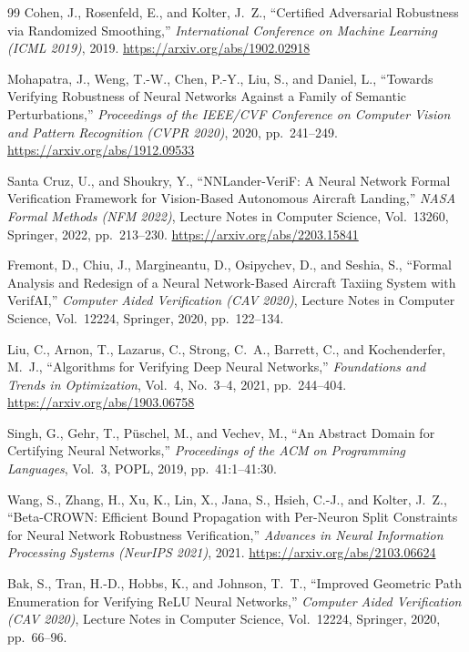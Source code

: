 \documentclass[twocolumn,smallextended,runningheads]{svjour3}
\begin{document}
\begin{thebibliography}{99}
Cohen, J., Rosenfeld, E., and Kolter, J.~Z., ``Certified Adversarial Robustness via Randomized Smoothing,'' \emph{International Conference on Machine Learning (ICML 2019)}, 2019. \url{https://arxiv.org/abs/1902.02918}

Mohapatra, J., Weng, T.-W., Chen, P.-Y., Liu, S., and Daniel, L., ``Towards Verifying Robustness of Neural Networks Against a Family of Semantic Perturbations,'' \emph{Proceedings of the IEEE/CVF Conference on Computer Vision and Pattern Recognition (CVPR 2020)}, 2020, pp.~241--249. \url{https://arxiv.org/abs/1912.09533}

Santa Cruz, U., and Shoukry, Y., ``NNLander-VeriF: A Neural Network Formal Verification Framework for Vision-Based Autonomous Aircraft Landing,'' \emph{NASA Formal Methods (NFM 2022)}, Lecture Notes in Computer Science, Vol.~13260, Springer, 2022, pp.~213--230. \url{https://arxiv.org/abs/2203.15841}

Fremont, D., Chiu, J., Margineantu, D., Osipychev, D., and Seshia, S., ``Formal Analysis and Redesign of a Neural Network-Based Aircraft Taxiing System with VerifAI,'' \emph{Computer Aided Verification (CAV 2020)}, Lecture Notes in Computer Science, Vol.~12224, Springer, 2020, pp.~122--134.

Liu, C., Arnon, T., Lazarus, C., Strong, C.~A., Barrett, C., and Kochenderfer, M.~J., ``Algorithms for Verifying Deep Neural Networks,'' \emph{Foundations and Trends in Optimization}, Vol.~4, No.~3--4, 2021, pp.~244--404. \url{https://arxiv.org/abs/1903.06758}

Singh, G., Gehr, T., P\"{u}schel, M., and Vechev, M., ``An Abstract Domain for Certifying Neural Networks,'' \emph{Proceedings of the ACM on Programming Languages}, Vol.~3, POPL, 2019, pp.~41:1--41:30.

Wang, S., Zhang, H., Xu, K., Lin, X., Jana, S., Hsieh, C.-J., and Kolter, J.~Z., ``Beta-CROWN: Efficient Bound Propagation with Per-Neuron Split Constraints for Neural Network Robustness Verification,'' \emph{Advances in Neural Information Processing Systems (NeurIPS 2021)}, 2021. \url{https://arxiv.org/abs/2103.06624}

Bak, S., Tran, H.-D., Hobbs, K., and Johnson, T.~T., ``Improved Geometric Path Enumeration for Verifying ReLU Neural Networks,'' \emph{Computer Aided Verification (CAV 2020)}, Lecture Notes in Computer Science, Vol.~12224, Springer, 2020, pp.~66--96.


\end{thebibliography}
\end{document}
